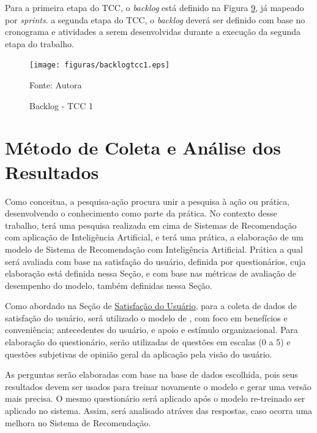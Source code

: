 Para a primeira etapa do TCC, o \textit{backlog} está definido na Figura \hyperref[fig:backlogtcc1]{9}, 
já mapeado por \textit{sprints}. a segunda etapa do TCC, o \textit{backlog}
deverá ser definido com base no cronograma e atividades a serem desenvolvidas durante a execução da segunda etapa do trabalho.

\begin{figure}[htbp]
    \centering
    \caption{Backlog - TCC 1}
    \label{fig:backlogtcc1}
    
    \vspace{2pt} %
    
    \texttt{[image: figuras/backlogtcc1.eps]}
    
    \vspace{2pt} %
    
    \small Fonte: Autora
\end{figure}

\section{Método de Coleta e Análise dos Resultados}\label{sec:meteanresul}

Como  conceitua, a pesquisa-ação procura unir a pesquisa à ação ou prática, desenvolvendo
o conhecimento como parte da prática. No contexto desse trabalho, terá uma pesquisa realizada em cima de Sistemas de Recomendação
com aplicação de Inteligência Artificial, e terá uma prática, a elaboração de um modelo de Sistema de Recomendação com Inteligência
Artificial. Prática a qual será avaliada com base na satisfação do usuário, definida por questionários, cuja elaboração está 
definida nessa Seção, e com base nas métricas de avaliação de desempenho do modelo, também definidas nessa Seção.

Como abordado na Seção de \hyperref[sec:expus]{Satisfação do Usuário}, para a coleta de dados de satisfação do usuário, 
será utilizado o modelo de , com foco em benefícios e conveniência; antecedentes do usuário,
e apoio e estímulo organizacional. Para elaboração do questionário, serão utilizadas de questões em escalas (0 a 5) e 
questões subjetivas de opinião geral da aplicação pela visão do usuário.

As perguntas serão elaboradas com base na base de dados escolhida, pois seus resultados devem ser usados para treinar 
novamente o modelo e gerar uma versão mais precisa. O mesmo questionário será aplicado após o modelo re-treinado ser 
aplicado no sistema. Assim, será analisado atráves das respostas, caso ocorra uma melhora no Sistema de Recomendação.

